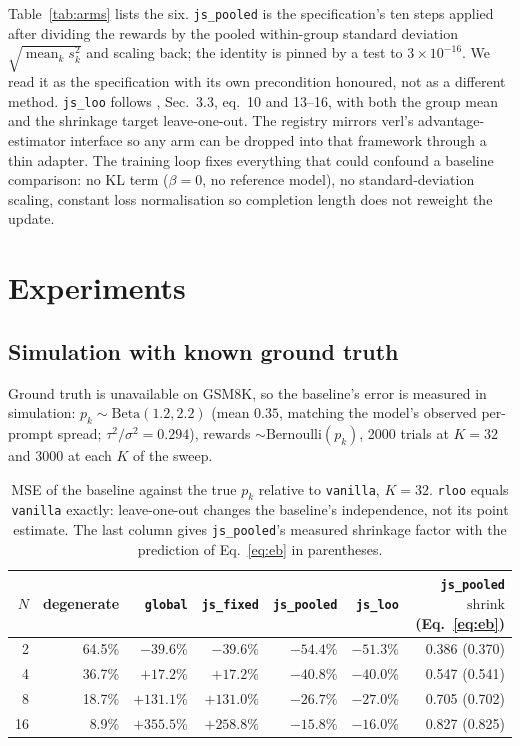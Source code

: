 \documentclass{article}
\newcommand{\shrink}{\mathrm{shrink}}
\newcommand{\arm}[1]{\texttt{#1}}
\begin{document}
Table~\ref{tab:arms} lists the six. \arm{js\_pooled} is the
specification's ten steps applied after dividing the rewards by the pooled
within-group standard deviation $\sqrt{\operatorname{mean}_k s_k^2}$ and
scaling back; the identity is pinned by a test to $3\times10^{-16}$. We
read it as the specification with its own precondition honoured, not as a
different method. \arm{js\_loo} follows \citet{zeng2025shrinking},
Sec.~3.3, eq.~10 and 13--16, with both the group mean and the shrinkage
target leave-one-out. The registry mirrors verl's advantage-estimator
interface so any arm can be dropped into that framework through a thin
adapter. The training loop fixes everything that could confound a baseline
comparison: no KL term ($\beta=0$, no reference model), no
standard-deviation scaling, constant loss normalisation so completion
length does not reweight the update.

\section{Experiments}

\subsection{Simulation with known ground truth}
\label{sec:synthetic}

Ground truth is unavailable on GSM8K, so the baseline's error is measured
in simulation: $p_k\sim\mathrm{Beta}(1.2,2.2)$ (mean $0.35$, matching the
model's observed per-prompt spread; $\tau^2/\sigma^2=0.294$), rewards
$\sim\mathrm{Bernoulli}(p_k)$, 2000 trials at $K=32$ and 3000 at each $K$
of the sweep.

\begin{table}[t]\centering\small
\begin{tabular}{rrrrrrr}
\toprule
$N$ & degenerate & \arm{global} & \arm{js\_fixed} & \arm{js\_pooled} & \arm{js\_loo} & \arm{js\_pooled} $\shrink$ (Eq.~\ref{eq:eb}) \\
\midrule
2  & 64.5\% & $-39.6\%$  & $-39.6\%$  & $-54.4\%$ & $-51.3\%$ & 0.386 (0.370) \\
4  & 36.7\% & $+17.2\%$  & $+17.2\%$  & $-40.8\%$ & $-40.0\%$ & 0.547 (0.541) \\
8  & 18.7\% & $+131.1\%$ & $+131.0\%$ & $-26.7\%$ & $-27.0\%$ & 0.705 (0.702) \\
16 & 8.9\%  & $+355.5\%$ & $+258.8\%$ & $-15.8\%$ & $-16.0\%$ & 0.827 (0.825) \\
\bottomrule
\end{tabular}
\caption{MSE of the baseline against the true $p_k$ relative to
\arm{vanilla}, $K=32$. \arm{rloo} equals \arm{vanilla} exactly:
leave-one-out changes the baseline's independence, not its point estimate.
The last column gives \arm{js\_pooled}'s measured shrinkage factor with the
prediction of Eq.~\eqref{eq:eb} in parentheses.}
\label{tab:synth}
\end{table}
\end{document}
